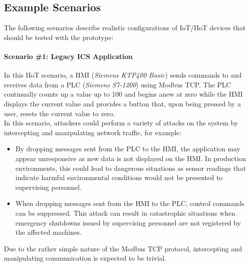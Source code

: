 \subsection{Example Scenarios}
\label{sec:example-scenarios}
The following scenarios describe realistic configurations of \ac{IoT}/\ac{IIoT} devices that should be tested with the prototype:

\paragraph{Scenario \#1: Legacy \ac{ICS} Application}
In this \ac{IIoT} scenario, a \ac{HMI} (\emph{Siemens KTP400 Basic}) sends commands to and receives data from a \ac{PLC} (\emph{Siemens S7-1200}) using Modbus \ac{TCP}. The \ac{PLC} continually counts up a value up to 100 and begins anew at zero while the \ac{HMI} displays the current value and provides a button that, upon being pressed by a user, resets the current value to zero. \\
In this scenario, attackers could perform a variety of attacks on the system by intercepting and manipulating network traffic, for example:
\begin{itemize}
    \item By dropping messages sent from the \ac{PLC} to the \ac{HMI}, the application may appear unresponsive as new data is not displayed on the \ac{HMI}. In production environments, this could lead to dangerous situations as sensor readings that indicate harmful environmental conditions would not be presented to supervising personnel.
    \item When dropping messages sent from the \ac{HMI} to the \ac{PLC}, control commands can be suppressed. This attack can result in catastrophic situations when emergency shutdowns issued by supervising personnel are not registered by the affected machines.
\end{itemize}

Due to the rather simple nature of the Modbus \ac{TCP} protocol, intercepting and manipulating communication is expected to be trivial. %

